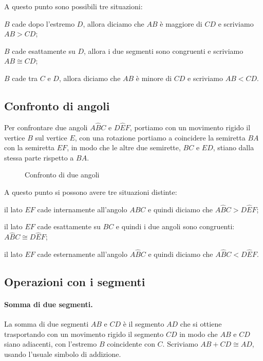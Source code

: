 A questo punto sono possibili tre situazioni:
\begin{itemize*}
\item $B$ cade dopo l'estremo $D$, allora diciamo che $AB$ è maggiore di $CD$ e scriviamo $AB>CD$;
\item $B$ cade esattamente su $D$, allora i due segmenti sono congruenti e scriviamo $AB\cong CD$;
\item $B$ cade tra $C$ e $D$, allora diciamo che $AB$ è minore di $CD$ e scriviamo $AB<CD$.
\end{itemize*}

\subsection{Confronto di angoli}

Per confrontare due angoli $A\widehat{B}C$ e $D\widehat{E}F$, portiamo con un movimento rigido il vertice $B$ sul vertice $E$, con una rotazione portiamo a coincidere la semiretta $BA$ con la semiretta $EF$, in modo che le altre due semirette, $BC$ e $ED$, stiano dalla stessa parte rispetto a $BA$.

\begin{figure}[htb]
\centering
\caption{Confronto di due angoli}
\end{figure}

A questo punto si possono avere tre situazioni distinte:
\begin{itemize*}
\item il lato $EF$ cade internamente all'angolo $A\widehat{B}C$ e quindi diciamo che $A\widehat{B}C>D\widehat{E}F$;
\item il lato $EF$ cade esattamente su $BC$ e quindi i due angoli sono congruenti: $A\widehat{B}C\cong D\widehat{E}F$;
\item il lato $EF$ cade esternamente all'angolo $A\widehat{B}C$ e quindi diciamo che $A\widehat{B}C<D\widehat{E}F$.
\end{itemize*}

\subsection{Operazioni con i segmenti}

\paragraph{Somma di due segmenti.} La somma di due segmenti $AB$ e $CD$ è il segmento $AD$ che si ottiene trasportando con un movimento rigido il segmento $CD$ in modo che $AB$ e $CD$ siano adiacenti, con l'estremo $B$ coincidente con $C$. Scriviamo $AB + CD \cong AD$, usando l'usuale simbolo di addizione.


